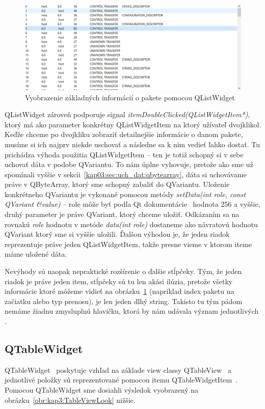 \begin{figure}[!htb]
	\centering
	\includegraphics[width=\textwidth]{img/kap03_ListViewLook}
	\caption{Vyobrazenie základných informácií o pakete pomocou QListWidget}
	\label{obr:kap3:ListViewLook}
\end{figure}

QListWidget zároveň podporuje signal \textit{itemDoubleClicked(QListWidgetItem*)}, ktorý má ako parameter konkrétny QListWidgetItem na ktorý užívateľ dvojklikol. Keďže chceme po dvojkliku zobraziť detailnejšie informácie o danom pakete, musíme si ich najprv niekde uschovať a následne sa k nim vedieť ľahko dostať. Tu prichádza výhoda použitia QListWidgetItem -- ten je totiž schopný si v sebe uchovať dáta v podobe QVariantu. To nám úplne vyhovuje, pretože ako sme už spomínali vyššie v sekcii~\ref{kap03:sec:uch_dat:qbytearray}, dáta si uchovávame práve v QByteArray, ktorý sme schopný zabaliť do QVariantu. Uloženie konkrétneho QVariantu je vykonané pomocou metódy \textit{setData(int role, const QVariant \&value)} -- role môže byť podľa Qt dokumentácie~\cite{qitemdatarole} hodnota 256 a vyššie, druhý parameter je práve QVariant, ktorý chceme uložiť. Odkázaním sa na rovnakú \textit{role} hodnotu v metóde \textit{data(int role)} dostaneme ako návratovú hodnotu QVariant ktorý sme si vyššie uložili. Ďalšou výhodou je, že jeden riadok reprezentuje práve jeden QListWidgetItem, takže presne vieme v ktorom iteme máme uložené dáta.

Nevýhody sú naopak nepraktické rozšírenie o ďalšie stĺpčeky. Tým, že jeden riadok je práve jeden item, stĺpčeky sú tu len akási ilúzia, pretože všetky informácie ktoré môžeme vidieť na obrázku~\ref{obr:kap3:ListViewLook} (napríklad index paketu na začiatku alebo typ prenosu), je len jeden dlhý string. Takisto tu tým pádom nemáme žiadnu zmysluplnú hlavičku, ktorá by nám udávala význam jednotlivých .

\subsection{QTableWidget}
QTableWidget~\cite{qtablewidget} poskytuje vzhľad na základe view classy QTableView~\cite{qtableview} a jednotlivé položky sú reprezentované pomocou itemu QTableWidgetItem~\cite{qtablewidgetitem}. Pomocou QTableWidget sme dosiahli výsledok vyobrazený na obrázku~\ref{obr:kap3:TableViewLook} nižšie.

